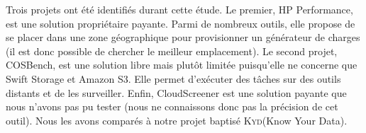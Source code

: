 \documentclass[10pt]{article}
\newcommand{\KYD}{\textsc{Kyd}\xspace}
\begin{document}
Trois projets ont été identifiés durant cette étude. Le premier, HP
Performance, est une solution propriétaire payante. Parmi de nombreux
outils, elle propose de se placer dans une zone géographique pour
provisionner un générateur de charges (il est donc possible de
chercher le meilleur emplacement). Le second projet, COSBench, est une
solution libre mais plutôt limitée puisqu’elle ne concerne que Swift
Storage et Amazon S3. Elle permet d'exécuter des tâches sur des outils
distants et de les surveiller. Enfin, CloudScreener est une solution
payante que nous n’avons pas pu tester (nous ne connaissons donc pas
la précision de cet outil). Nous les avons comparés à notre projet
baptisé \KYD (Know Your Data).


\end{document}
